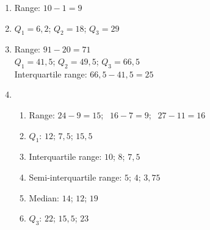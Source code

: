  \begin{solutions}{}{
\begin{enumerate}[itemsep=5pt, label=\textbf{\arabic*}. ] 
\item Range: $10-1=9$
\item $Q_1 = 6,2$; $ Q_2 = 18$; $Q_3 = 29$
\item Range: $91-20=71$\\
 $Q_1 = 41,5$; $Q_2 = 49,5$; $Q_3 = 66,5$ \\
 Interquartile range: $66,5-41,5=25$
\item 
\begin{enumerate}[noitemsep, label=\textbf{(\alph*)} ]
    \item Range: $24-9=15$; $~~16-7=9$; $~~27-11=16$
    \item $Q_1$: $12$;  $7,5$; $15,5$ 
    \item Interquartile range: $10$; $8$; $7,5$
    \item Semi-interquartile range: $5$; $4$; $3,75$
    \item Median: $14$; $12$; $19$
    \item $Q_3$: $22$; $15,5$; $23$
\end{enumerate}

\end{enumerate}}
\end{solutions}

